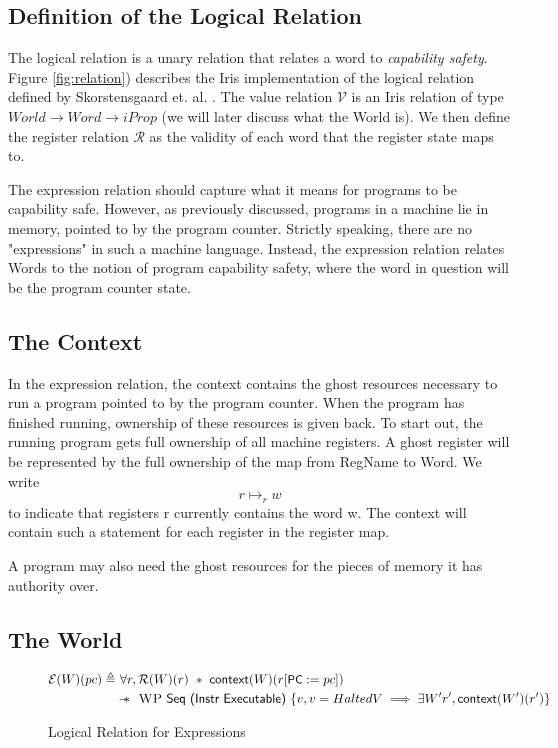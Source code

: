 \documentclass[sigplan,review,anonymous]{acmart}\settopmatter{printfolios=true,printccs=false,printacmref=false}
\newcommand{\sep}{-\kern-.6em\raisebox{-.659ex}{*}\ }
\newcommand{\interp}[2]{(#1)(#2)}
\begin{document}
\subsection{Definition of the Logical Relation}
The logical relation is a unary relation that relates a word to  \textit{capability safety}. Figure \ref{fig:relation}) describes the Iris implementation of the logical relation defined by Skorstensgaard et. al. \cite{skorstensgaard}. The value relation $\mathcal{V}$ is an Iris relation of type $World \to Word \to iProp$ (we will later discuss what the World is). We then define the register relation $\mathcal{R}$ as the validity of each word that the register state maps to. 

The expression relation should capture what it means for programs to be capability safe. However, as previously discussed, programs in a machine lie in memory, pointed to by the program counter. Strictly speaking, there are no "expressions" in such a machine language. Instead, the expression relation relates Words to the notion of program capability safety, where the word in question will be the program counter state.

\subsection{The Context}
In the expression relation, the \textsf{context} contains the ghost resources necessary to run a program pointed to by the program counter. When the program has finished running, ownership of these resources is given back. To start out, the running program gets full ownership of all machine registers. A ghost register will be represented by the full ownership of the map from RegName to Word. We write 
$$ r \mapsto_r w$$
to indicate that registers r currently contains the word w. The context will contain such a statement for each register in the register map. 

A program may also need the ghost resources for the pieces of memory it has authority over. 

\subsection{The World}

\begin{figure*}[ht]
	\begin{minipage}{\textwidth}
	\begin{align*}
		\mathcal{E}\interp{W}{pc} \triangleq&~\forall r, \mathcal{R}(W)(r) ~*~\textsf{context}(W)(r[\textsf{\small PC}:=pc])\\
		&\sep~\textsc{WP}~\textsf{Seq (Instr Executable)}~\{ v, v = HaltedV \implies \exists W' r', \textsf{context}(W')(r')\}
	\end{align*}
	\end{minipage}
	\label{fig:expr}
	\caption{Logical Relation for Expressions}
\end{figure*}
\end{document}
